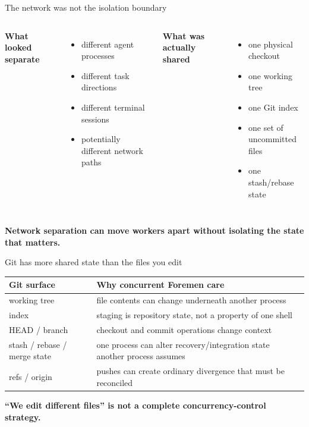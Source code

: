 \documentclass{beamer}
\begin{document}
\begin{frame}{The network was not the isolation boundary}
\begin{columns}[T]
\textbf{What looked separate}
\begin{itemize}
  \item different agent processes
  \item different task directions
  \item different terminal sessions
  \item potentially different network paths
\end{itemize}

\textbf{What was actually shared}
\begin{itemize}
  \item one physical checkout
  \item one working tree
  \item one Git index
  \item one set of uncommitted files
  \item one stash/rebase state
\end{itemize}
\end{columns}

\vspace{0.8em}
\centering
\textbf{Network separation can move workers apart without isolating the state that matters.}
\end{frame}

\begin{frame}{Git has more shared state than the files you edit}
\small
\begin{tabular}{p{}p{}}
\toprule
\textbf{Git surface} & \textbf{Why concurrent Foremen care} \\
\midrule
working tree & file contents can change underneath another process \\
index & staging is repository state, not a property of one shell \\
HEAD / branch & checkout and commit operations change context \\
stash / rebase / merge state & one process can alter recovery/integration state another process assumes \\
refs / origin & pushes can create ordinary divergence that must be reconciled \\
\bottomrule
\end{tabular}

\vspace{0.8em}
\textbf{``We edit different files'' is not a complete concurrency-control strategy.}
\end{frame}
\end{document}
